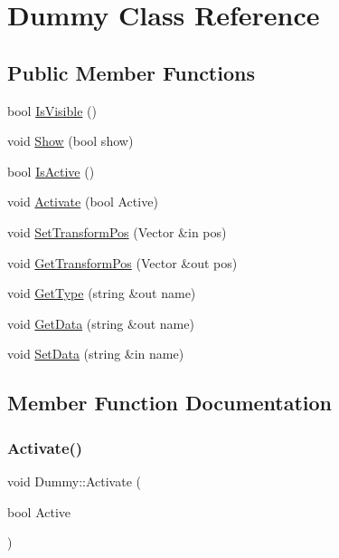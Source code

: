 \hypertarget{class_dummy}{}\section{Dummy Class Reference}
\label{class_dummy}
\subsection*{Public Member Functions}
\begin{DoxyCompactItemize}
\item 
bool \hyperlink{class_dummy_aab7cb3b827e98f4598b6d6a561a5aeb9}{Is\+Visible} ()
\item 
void \hyperlink{class_dummy_afd2b2ae6270dfd52b7984950d159fd79}{Show} (bool show)
\item 
bool \hyperlink{class_dummy_ad4f2cb10515621b0ca1e8e834519f77c}{Is\+Active} ()
\item 
void \hyperlink{class_dummy_aa94ec329aef78287bc4b2e52aec7b0b7}{Activate} (bool Active)
\item 
void \hyperlink{class_dummy_a23e80e646b83fa5133ec4dc397728170}{Set\+Transform\+Pos} (Vector \&in pos)
\item 
void \hyperlink{class_dummy_abad9d9d1ad1b457149f727f629a9d770}{Get\+Transform\+Pos} (Vector \&out pos)
\item 
void \hyperlink{class_dummy_a6395fd33323a1a1517228b992a01d922}{Get\+Type} (string \&out name)
\item 
void \hyperlink{class_dummy_a5f6a8f72a647cecddafa92517a3e5891}{Get\+Data} (string \&out name)
\item 
void \hyperlink{class_dummy_afc095f7a5802a7a480032fb0d1403b2a}{Set\+Data} (string \&in name)
\end{DoxyCompactItemize}


\subsection{Member Function Documentation}
\hypertarget{class_dummy_aa94ec329aef78287bc4b2e52aec7b0b7}{}\label{class_dummy_aa94ec329aef78287bc4b2e52aec7b0b7} 
\subsubsection{\texorpdfstring{Activate()}{Activate()}}
{\footnotesize\ttfamily void Dummy\+::\+Activate (\begin{DoxyParamCaption}\item[{bool}]{Active }\end{DoxyParamCaption})}

